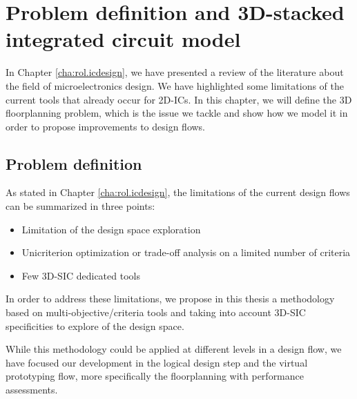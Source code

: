 \chapter{Problem definition and 3D-stacked integrated circuit model}
\label{cha:model}

\begin{summary}
\lipsum[1]
\end{summary}

In Chapter \ref{cha:rol.icdesign}, we have presented a review of the literature about the field of microelectronics design. We have highlighted some limitations of the current tools that already occur for 2D-ICs. In this chapter, we will define the 3D floorplanning problem, which is the issue we tackle and show how we model it in order to propose improvements to design flows.

\section{Problem definition}
As stated in Chapter \ref{cha:rol.icdesign}, the limitations of the current design flows can be summarized in three points:
\begin{itemize}
\item Limitation of the design space exploration
\item Unicriterion optimization or trade-off analysis on a limited number of criteria
\item Few 3D-SIC dedicated tools
\end{itemize}
In order to address these limitations, we propose in this thesis a methodology based on multi-objective/criteria tools and taking into account 3D-SIC specificities to explore of the design space.

While this methodology could be applied at different levels in a design flow, we have focused our development in the logical design step and the virtual prototyping flow, more specifically the floorplanning with performance assessments.

